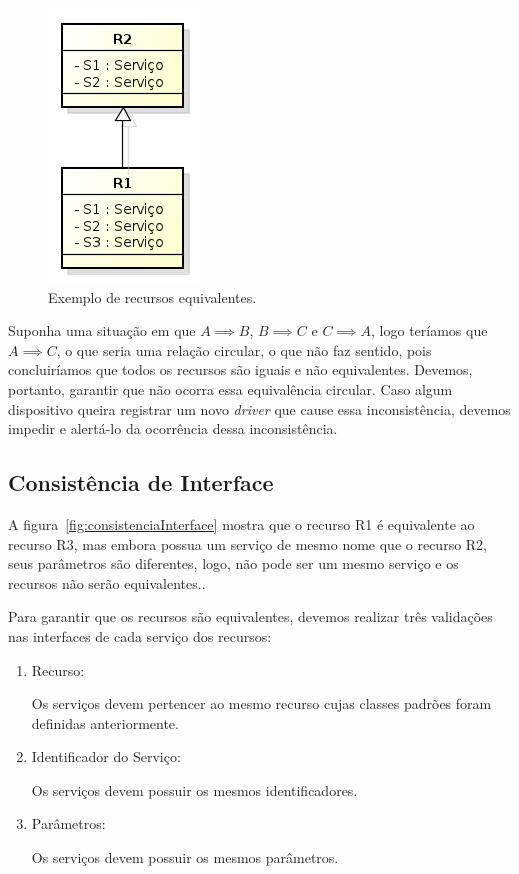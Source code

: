 \begin{figure}[ht]
	\center
	\includegraphics[scale=0.6]{imagens/equivalenciaDeRecursos}
	\caption{Exemplo de recursos equivalentes.}
	\label{fig:equivalenciaDeRecursos}
\end{figure}

Suponha uma situação em que $A \implies B$, $B \implies C$ e $C \implies A$, logo teríamos que $A \implies C$, o que seria uma relação circular, o que não faz sentido, pois concluiríamos que todos os recursos são iguais e não equivalentes. Devemos, portanto, garantir que não ocorra essa equivalência circular. Caso algum dispositivo queira registrar um novo \emph{driver} que cause essa inconsistência, devemos impedir e alertá-lo da ocorrência dessa inconsistência. 

\subsection{Consistência de Interface}

	A figura~\ref{fig:consistenciaInterface} mostra que o recurso R1 é equivalente ao recurso R3, mas embora possua um serviço de mesmo nome que o recurso R2,  seus parâmetros são diferentes, logo, não pode ser um mesmo serviço e os recursos não serão equivalentes..
	
	Para garantir que os recursos são equivalentes, devemos realizar três validações nas interfaces de cada serviço dos recursos:
	\begin{enumerate}
		\item Recurso:
			
			Os serviços devem pertencer ao mesmo recurso cujas classes padrões foram definidas anteriormente.
		
		\item Identificador do Serviço:

			Os serviços devem possuir os mesmos identificadores.

		\item Parâmetros:

			Os serviços devem possuir os mesmos parâmetros.
	\end{enumerate}

